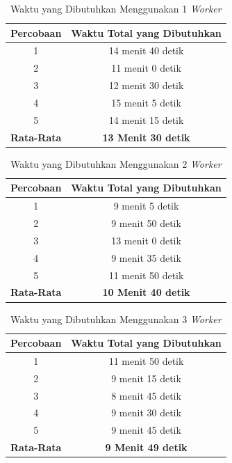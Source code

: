 \begin{longtable}{|c|c|}
  \caption{Waktu yang Dibutuhkan Menggunakan 1 \emph{Worker}}
  \label{tb:test-1-worker}                                   \\
  \hline
  \rowcolor[HTML]{C0C0C0}
  \textbf{Percobaan} & \textbf{Waktu Total yang Dibutuhkan} \\
  \hline
  1            & 14 menit 40 detik \\
  2            & 11 menit  0 detik \\
  3            & 12 menit 30 detik \\
  4            & 15 menit  5 detik \\
  5            & 14 menit 15 detik \\
  \hline
  \textbf{Rata-Rata} & \textbf{13 Menit 30 detik} \\
  \hline
\end{longtable}

\begin{longtable}{|c|c|}
  \caption{Waktu yang Dibutuhkan Menggunakan 2 \emph{Worker}}
  \label{tb:test-2-worker}                                   \\
  \hline
  \rowcolor[HTML]{C0C0C0}
  \textbf{Percobaan} & \textbf{Waktu Total yang Dibutuhkan} \\
  \hline
  1 &  9 menit  5 detik \\
  2 &  9 menit 50 detik \\
  3 & 13 menit  0 detik \\
  4 &  9 menit 35 detik \\
  5 & 11 menit 50 detik \\
  \hline
  \textbf{Rata-Rata} & \textbf{10 Menit 40 detik} \\
  \hline
\end{longtable}

\begin{longtable}{|c|c|}
  \caption{Waktu yang Dibutuhkan Menggunakan 3 \emph{Worker}}
  \label{tb:test-3-worker}                                   \\
  \hline
  \rowcolor[HTML]{C0C0C0}
  \textbf{Percobaan} & \textbf{Waktu Total yang Dibutuhkan} \\
  \hline
  1 & 11 menit 50 detik \\
  2 &  9 menit 15 detik \\
  3 &  8 menit 45 detik \\
  4 &  9 menit 30 detik \\
  5 &  9 menit 45 detik \\
  \hline
  \textbf{Rata-Rata} & \textbf{9 Menit 49 detik} \\
  \hline
\end{longtable}

